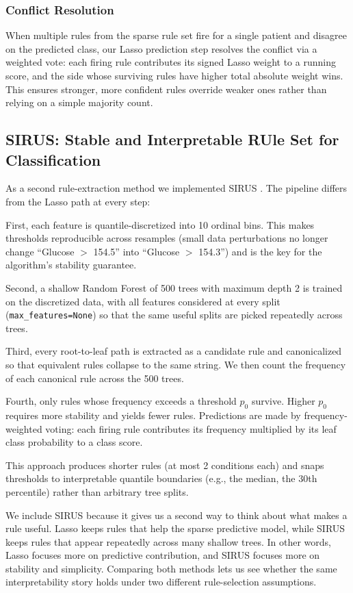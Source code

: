 \documentclass[11pt]{article}
\begin{document}
\subsubsection{Conflict Resolution}

When multiple rules from the sparse rule set fire for a single patient and disagree on the predicted class, our Lasso prediction step resolves the conflict via a weighted vote: each firing rule contributes its signed Lasso weight to a running score, and the side whose surviving rules have higher total absolute weight wins. This ensures stronger, more confident rules override weaker ones rather than relying on a simple majority count.

\subsection{SIRUS: Stable and Interpretable RUle Set for Classification}

As a second rule-extraction method we implemented SIRUS \cite{benard2021sirus}. The pipeline differs from the Lasso path at every step:

First, each feature is quantile-discretized into 10 ordinal bins. This makes thresholds reproducible across resamples (small data perturbations no longer change ``Glucose $>$ 154.5'' into ``Glucose $>$ 154.3'') and is the key for the algorithm's stability guarantee.

Second, a shallow Random Forest of 500 trees with maximum depth 2 is trained on the discretized data, with all features considered at every split (\texttt{max\_features=None}) so that the same useful splits are picked repeatedly across trees.

Third, every root-to-leaf path is extracted as a candidate rule and canonicalized so that equivalent rules collapse to the same string. We then count the frequency of each canonical rule across the 500 trees.

Fourth, only rules whose frequency exceeds a threshold $p_0$ survive. Higher $p_0$ requires more stability and yields fewer rules. Predictions are made by frequency-weighted voting: each firing rule contributes its frequency multiplied by its leaf class probability to a class score.

This approach produces shorter rules (at most 2 conditions each) and snaps thresholds to interpretable quantile boundaries (e.g., the median, the 30th percentile) rather than arbitrary tree splits.

We include SIRUS because it gives us a second way to think about what makes a rule useful. Lasso keeps rules that help the sparse predictive model, while SIRUS keeps rules that appear repeatedly across many shallow trees. In other words, Lasso focuses more on predictive contribution, and SIRUS focuses more on stability and simplicity. Comparing both methods lets us see whether the same interpretability story holds under two different rule-selection assumptions.
\end{document}
